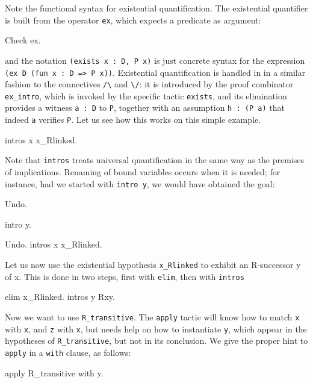 \documentclass[11pt,a4paper]{book}
\begin{document}
Note the functional syntax for existential quantification. The existential
quantifier is built from the operator \verb:ex:, which expects a
predicate as argument:
\begin{coq_example}
Check ex.
\end{coq_example}
and the notation \verb+(exists x : D, P x)+ is just concrete syntax for
the expression \verb+(ex D (fun x : D => P x))+.
Existential quantification is handled in \Coq{} in a similar
fashion to the connectives \verb:/\: and \verb:\/:: it is introduced by
the proof combinator \verb:ex_intro:, which is invoked by the specific
tactic \verb:exists:, and its elimination provides a witness \verb+a : D+ to
\verb:P:, together with an assumption \verb+h : (P a)+ that indeed \verb+a+
verifies \verb:P:. Let us see how this works on this simple example.
\begin{coq_example}
intros x x_Rlinked.
\end{coq_example}

Note that \verb:intros: treats universal quantification in the same way
as the premises of implications. Renaming of bound variables occurs
when it is needed; for instance, had we started with \verb:intro y:,
we would have obtained the goal:
\begin{coq_eval}
Undo.
\end{coq_eval}
\begin{coq_example}
intro y.
\end{coq_example}
\begin{coq_eval}
Undo.
intros x x_Rlinked.
\end{coq_eval}

Let us now use the existential hypothesis \verb:x_Rlinked: to
exhibit an R-successor y of x. This is done in two steps, first with
\verb:elim:, then with \verb:intros:

\begin{coq_example}
elim x_Rlinked.
intros y Rxy.
\end{coq_example}

Now we want to use \verb:R_transitive:. The \verb:apply: tactic will know
how to match \verb:x: with \verb:x:, and \verb:z: with \verb:x:, but needs
help on how to instantiate \verb:y:, which appear in the hypotheses of
\verb:R_transitive:, but not in its conclusion. We give the proper hint
to \verb:apply: in a \verb:with: clause, as follows:
\begin{coq_example}
apply R_transitive with y.
\end{coq_example}
\end{document}

